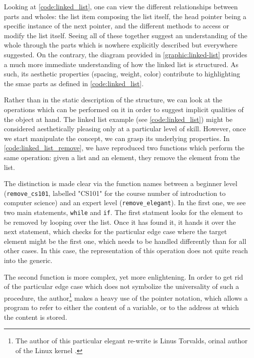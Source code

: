 Looking at \ref{code:linked_list}, one can view the different relationships between parts and wholes: the list item composing the list itself, the head pointer being a specific instance of the next pointer, and the different methods to access or modify the list itself. Seeing all of these together suggest an understanding of the whole through the parts which is nowhere explicitly described but everywhere suggested. On the contrary, the diagram provided in \ref{graphic:linked-list} provides a much more immediate understanding of how the linked list is structured. As such, its aesthetic properties (spacing, weight, color) contribute to highlighting the smae parts as defined in \ref{code:linked_list}.

Rather than in the static description of the structure, we can look at the operations which can be performed on it in order to suggest implicit qualities of the object at hand. The linked list example (see \ref{code:linked_list}) might be considered aesthetically pleasing only at a particular level of skill. However, once we start manipulate the concept, we can grasp its underlying properties. In \ref{code:linked_list_remove}, we have reproduced two functions which perform the same operation: given a list and an element, they remove the element from the list.

The distinction is made clear via the function names between a beginner level (\lstinline{remove_cs101}, labelled "CS101" for the course number of introduction to computer science) and an expert level (\lstinline{remove_elegant}). In the first one, we see two main statements, \lstinline{while} and \lstinline{if}. The first statment looks for the element to be removed by looping over the list. Once it has found it, it hands it over the next statement, which checks for the particular edge case where the target element might be the first one, which needs to be handled differently than for all other cases. In this case, the representation of this operation does not quite reach into the generic.

The second function is more complex, yet more enlightening. In order to get rid of the particular edge case which does not symbolize the universality of such a procedure, the author\footnote{The author of this particular elegant re-write is Linus Torvalds, orinal author of the Linux kernel \citep{torvalds_linus_2016}.} makes a heavy use of the pointer notation, which allows a program to refer to either the content of a variable, or to the address at which the content is stored.

